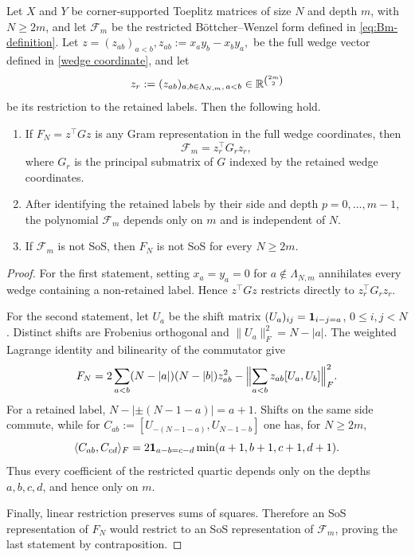 \begin{lemma}\label{lem:corner}
Let $X$ and $Y$ be corner-supported Toeplitz matrices of size $N$ and
depth $m$, with $N\ge 2m$, and let $\mathcal F_m$ be the restricted
B\"ottcher--Wenzel form defined in \eqref{eq:Bm-definition}.  Let
$
 z=(z_{ab})_{a<b},
 z_{ab}:=x_a y_b-x_b y_a,
$
be the full wedge vector defined in \eqref{wedge coordinate}, and let
\begin{equation}
\label{restricted wedge coordinate}
 z_r:=(z_{ab})_{
 a,b\in\Lambda_{N,m},\,a<b}
 \in\mathbb{R}^{\binom{2m}{2}}
\end{equation}
be its restriction to the retained labels.
Then the following hold.
\begin{enumerate}
\item
If
$
        F_N=z^\top Gz
$
is any Gram representation in the full wedge coordinates, then
\[
        \mathcal F_m=z_r^\top G_rz_r,
\]
where $G_r$ is the principal submatrix of $G$ indexed by the retained
wedge coordinates.

\item
After identifying the retained labels by their side and depth
$p=0,\ldots,m-1$, the polynomial $\mathcal F_m$ depends only on $m$ and
is independent of $N$.

\item
If $\mathcal F_m$ is not SoS, then $F_N$ is not SoS for every
$N\ge2m$.
\end{enumerate}
\end{lemma}

\begin{proof}
For the first statement, setting $x_a=y_a=0$ for $a\notin\Lambda_{N,m}$ annihilates every wedge containing a non-retained label. Hence $z^\top Gz$ restricts directly to $z_r^\top G_rz_r$.

For the second statement, let $U_a$ be the shift matrix $(U_a)_{ij}=\mathbf{1}_{i-j=a}$, $0\le i,j<N$. Distinct shifts are Frobenius orthogonal and $\|U_a\|_F^2=N-|a|$. The weighted Lagrange identity \cite[Lemma~10]{laszlo2012} and bilinearity of the commutator give
\begin{equation}\label{eq:literal-gram}
 F_N=
 2\sum_{a<b}(N-|a|)(N-|b|)z_{ab}^2
 -
 \Bigl\|\sum_{a<b}z_{ab}[U_a,U_b]\Bigr\|_F^2.
\end{equation}
For a retained label, $N-|\pm(N-1-a)|=a+1$. Shifts on the same side commute, while for $C_{ab}:=[U_{-(N-1-a)},U_{N-1-b}]$ one has, for $N\ge2m$,
\begin{equation}\label{eq:commutator-overlap}
 \langle C_{ab},C_{cd}\rangle_F
 =
 2\mathbf{1}_{a-b=c-d}\min(a+1,b+1,c+1,d+1).
\end{equation}
Thus every coefficient of the restricted quartic depends only on the depths $a,b,c,d$, and hence only on $m$.

Finally, linear restriction preserves sums of squares. Therefore an SoS representation of $F_N$ would restrict to an SoS representation of $\mathcal F_m$, proving the last statement by contraposition.
\end{proof}

